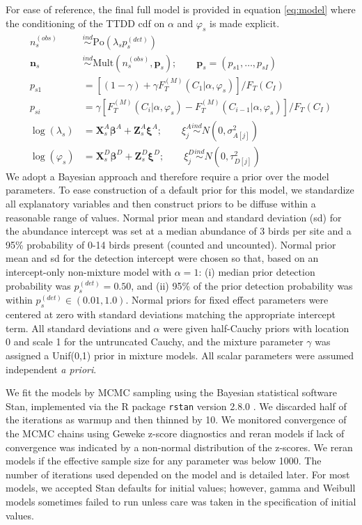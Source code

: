 \documentclass[useAMS,usenatbib,referee,12pt]{article}
\newcommand{\vn}{\textbf{n}}
\newcommand{\vp}{\textbf{p}}
\newcommand{\vX}{\textbf{X}}
\newcommand{\vZ}{\textbf{Z}}
\newcommand{\vbeta}{\boldsymbol{\beta}}
\newcommand{\vxi}{\boldsymbol{\xi}}
\newcommand{\Po}{\mbox{Po}}
\newcommand{\Mult}{\mbox{Mult}}
\newcommand{\pdet}{p^{(det)}}
\newcommand{\ind}{\stackrel{ind}{\sim}}
\newcommand{\Fm}{F_T^{(M)}}
\begin{document}
For ease of reference, the final full model is provided in equation \eqref{eq:model} where the conditioning of the TTDD cdf on $\alpha$ and $\varphi_s$ is made explicit.
\begin{align}
n_s^{(obs)} &\ind \Po(\lambda_s \pdet_s) \nonumber\\
\vn_s &\ind \Mult(n_s^{(obs)}, \vp_s); \qquad \vp_s = (p_{s1},\dots,p_{sI}) \nonumber\\
p_{s1} &= \left[(1-\gamma) + \gamma\Fm(C_1|\alpha,\varphi_s)\right]/F_T(C_I) \nonumber\\
p_{si} &= \gamma\left[\Fm(C_i|\alpha,\varphi_s) - \Fm(C_{i-1}|\alpha,\varphi_s)\right]/F_T(C_I) \nonumber\\
\log(\lambda_s) &= \vX_{s}^A\vbeta^A + \vZ_{s}^A\vxi^A; \qquad \xi_j^A \ind N(0,\sigma_{A[j]}^2) \nonumber\\
\label{eq:model}\log(\varphi_{s}) &= \vX_{s}^D\vbeta^D + \vZ_{s}^D\vxi^D; \qquad \xi_j^D \ind N(0,\tau_{D[j]}^2)
\end{align}
We adopt a Bayesian approach and therefore require a prior over the model parameters.
To ease construction of a default prior for this model, we standardize all explanatory variables and then construct priors to be diffuse within a reasonable range of values.
Normal prior mean and standard deviation (sd) for the abundance intercept was set at a median abundance of 3 birds per site and a 95\% probability of 0-14 birds present (counted and uncounted).  
Normal prior mean and sd for the detection intercept were chosen so that, based on an intercept-only non-mixture model with $\alpha=1$: (i) median prior detection probability was $p_{s}^{(det)} = 0.50$, and (ii) 95\% of the prior detection probability was within $p_{s}^{(det)} \in (0.01, 1.0)$.  
Normal priors for fixed effect parameters were centered at zero with standard deviations matching the appropriate intercept term.  
All standard deviations and $\alpha$ were given half-Cauchy priors with location 0 and scale 1 for the untruncated Cauchy, and the mixture parameter $\gamma$ was assigned a Unif(0,1) prior in mixture models.
All scalar parameters were assumed independent \emph{a priori}. 



We fit the models by MCMC sampling using the Bayesian statistical software Stan, implemented via the R package \texttt{rstan} version 2.8.0 \citep{Rstan2015}.  
We discarded half of the iterations as warmup and then thinned by 10.  
We monitored convergence of the MCMC chains using Geweke z-score diagnostics \citep{Geweke1991} and reran models if lack of convergence was indicated by a non-normal distribution of the z-scores. 
We reran models if the effective sample size for any parameter was below 1000.  
The number of iterations used depended on the model and is detailed later. 
For most models, we accepted Stan defaults for initial values; however, gamma and Weibull models sometimes failed to run unless care was taken in the specification of initial values.
\end{document}
